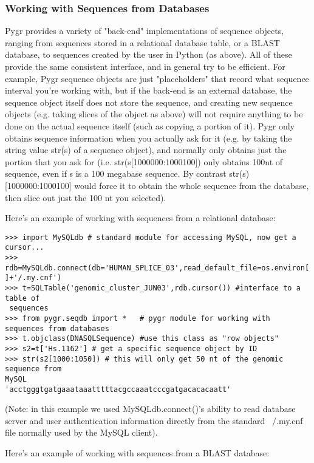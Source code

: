 \documentclass{howto}
\begin{document}
\subsubsection{Working with Sequences from Databases}

Pygr provides a variety of "back-end" implementations of sequence objects, ranging from sequences stored in a relational database table, or a BLAST database, to sequences created by the user in Python (as above).  All of these provide the same consistent interface, and in general try to be efficient.  For example, Pygr sequence objects are just "placeholders" that record what sequence interval you're working with, but if the back-end is an external database, the sequence object itself does not store the sequence, and creating new sequence objects (e.g. taking slices of the object as above) will not require anything to be done on the actual sequence itself (such as copying a portion of it).  Pygr only obtains sequence information when you actually ask for it (e.g. by taking the string value str(s) of a sequence object), and normally only obtains just the portion that you ask for (i.e. str(s[1000000:1000100]) only obtains 100nt of sequence, even if s is a 100 megabase sequence.  By contrast str(s)[1000000:1000100] would force it to obtain the whole sequence from the database, then slice out just the 100 nt you selected). 

Here's an example of working with sequences from a relational database:

\begin{verbatim}
>>> import MySQLdb # standard module for accessing MySQL, now get a cursor...
>>> rdb=MySQLdb.connect(db='HUMAN_SPLICE_03',read_default_file=os.environ['HOME'
]+'/.my.cnf')
>>> t=SQLTable('genomic_cluster_JUN03',rdb.cursor()) #interface to a table of
 sequences
>>> from pygr.seqdb import *   # pygr module for working with sequences from databases
>>> t.objclass(DNASQLSequence) #use this class as "row objects"
>>> s2=t['Hs.1162'] # get a specific sequence object by ID
>>> str(s2[1000:1050]) # this will only get 50 nt of the genomic sequence from 
MySQL
'acctgggtgatgaaataaatttttacgccaaatcccgatgacacacaatt'
\end{verbatim}

(Note: in this example we used MySQLdb.connect()'s ability to read database 
server and user authentication information directly from the standard ~/.my.cnf file normally used by the MySQL client).

Here's an example of working with sequences from a BLAST database:
\end{document}
